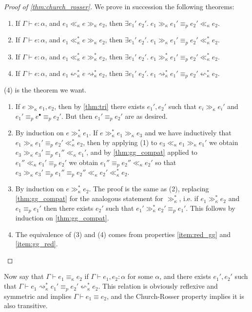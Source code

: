\begin{proof}[Proof of \autoref{thm:church_rosser}]
We prove in succession the following theorems:
\begin{enumerate}
\item If $\Gamma\vdash e:\alpha$, and $e_1\ll_\kappa e\gg_\kappa e_2$, then $\exists e_1'\;e_2'.\; e_1\gg_\kappa e_1'\equiv_p e_2'\ll_\kappa e_2$.
\item If $\Gamma\vdash e:\alpha$, and $e_1\ll_\kappa^* e\gg_\kappa e_2$, then $\exists e_1'\;e_2'.\; e_1\gg_\kappa e_1'\equiv_p e_2'\ll_\kappa^* e_2$.
\item If $\Gamma\vdash e:\alpha$, and $e_1\ll_\kappa^* e\gg_\kappa^* e_2$, then $\exists e_1'\;e_2'.\; e_1\gg_\kappa^* e_1'\equiv_p e_2'\ll_\kappa^* e_2$.
\item If $\Gamma\vdash e:\alpha$, and $e_1\leftsquigarrow_\kappa^*e\rightsquigarrow_\kappa^* e_2$, then $\exists e_1'\;e_2'.\; e_1\rightsquigarrow_\kappa^* e_1'\equiv_p e_2'\leftsquigarrow_\kappa^* e_2$.
\end{enumerate}
(4) is the theorem we want.
\begin{enumerate}
\item If $e\gg_\kappa e_1,e_2$, then by \autoref{thm:tri} there exists $e_1',e_2'$ such that $e_i\gg_\kappa e_i'$ and $e_1'\equiv_p e^\bullet\equiv_p e_2'$. But then $e_1'\equiv_p e_2'$ are as desired. 
\item By induction on $e\gg_\kappa^* e_1$. If $e\gg_\kappa^* e_1\gg_\kappa e_3$ and we have inductively that $e_1\gg_\kappa e_1'\equiv_p e_2'\ll_\kappa^* e_2$, then by applying (1) to $e_3\ll_\kappa e_1\gg_\kappa e_1'$ we obtain $e_3\gg_\kappa e_3'\equiv_p e_1''\ll_\kappa e_1'$, and by \autoref{thm:gg_compat} applied to $e_1''\ll_\kappa e_1'\equiv_p e_2'$ we obtain $e_1''\equiv_p e_2''\ll_\kappa e_2'$ so that  $e_3\gg_\kappa e_3'\equiv_p e_1''\equiv_p e_2''\ll_\kappa e_2'\ll_\kappa^* e_2$.
\item By induction on $e\gg_\kappa^* e_2$. The proof is the same as (2), replacing \autoref{thm:gg_compat} for the analogous statement for $\gg_\kappa^*$, i.e. if $e_1\gg_\kappa^*e_2$ and $e_1\equiv_p e_1'$ then there exists $e_2'$ such that $e_1'\gg_\kappa^*e_2'\equiv_p e_1'$. This follows by induction on \autoref{thm:gg_compat}.
\item  The equivalence of (3) and (4) comes from properties \ref{item:red_gg} and \ref{item:gg_red}.
\end{enumerate}
\end{proof}

Now say that $\Gamma\vdash e_1\equiv_\kappa e_2$ if $\Gamma\vdash e_1,e_2:\alpha$ for some $\alpha$, and there exists $e_1',e_2'$ such that $\Gamma\vdash e_1\rightsquigarrow_\kappa^* e_1'\equiv_p e_2'\leftsquigarrow_\kappa^* e_2$. This relation is obviously reflexive and symmetric and implies $\Gamma\vdash e_1\equiv e_2$, and the Church-Rosser property implies it is also transitive.

